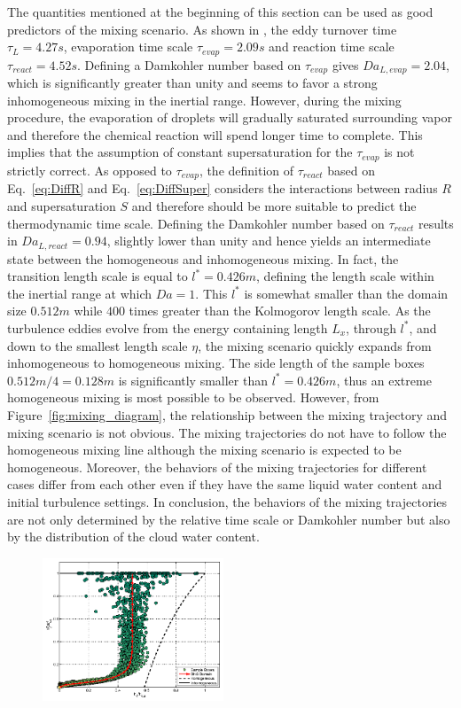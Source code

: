 \documentclass[draft,jgrga]{AGUTeX}
\newcommand{\Eq}[1]{Eq.~\eqref{#1}} \newcommand{\Fig}[1]{Figure~\ref{#1}}
\begin{document}
\begin{article}
The quantities mentioned at the beginning of this section can be used as good predictors of the mixing scenario. As shown in , the eddy turnover time $\tau_L = 4.27s$, evaporation time scale $\tau_{evap} = 2.09s$ and reaction time scale $\tau_{react} = 4.52s$. Defining a Damkohler number based on $\tau_{evap}$ gives $Da_{L,evap} = 2.04$, which is significantly greater than unity and seems to favor a strong inhomogeneous mixing in the inertial range. However, during the mixing procedure, the evaporation of droplets will gradually saturated surrounding vapor and therefore the chemical reaction will spend longer time to complete. This implies that the assumption of constant supersaturation for the $\tau_{evap}$ is not strictly correct. 
As opposed to $\tau_{evap}$, the definition of $\tau_{react}$ based on \Eq{eq:DiffR} and \Eq{eq:DiffSuper} considers the interactions between radius $R$ and supersaturation $S$ and therefore should be more suitable to predict the thermodynamic time scale. Defining the Damkohler number based on $\tau_{react}$ results in $Da_{L,react} = 0.94$, slightly lower than unity and hence yields an intermediate state between the homogeneous and inhomogeneous mixing. In fact, the transition length scale is equal to $l^{*} = 0.426m$, defining the length scale within the inertial range at which $Da = 1$. This $l^*$ is somewhat smaller than the domain size $0.512m$ while $400$ times greater than the Kolmogorov length scale. As the turbulence eddies evolve from the energy containing length $L_x$, through $l^*$, and down to the smallest length scale $\eta$, the mixing scenario quickly expands from inhomogeneous to homogeneous mixing. The side length of the sample boxes $0.512m/4 = 0.128 m$ is significantly smaller than $l^* = 0.426m$, thus an extreme homogeneous mixing is most possible to be observed. However, from \Fig{fig:mixing_diagram}, the relationship between the mixing trajectory and mixing scenario is not obvious. The mixing trajectories do not have to follow the homogeneous mixing line although the mixing scenario is expected to be homogeneous. Moreover, the behaviors of the mixing trajectories for different cases differ from each other even if they have the same liquid water content and initial turbulence settings. In conclusion, the behaviors of the mixing trajectories are not only determined by the relative time scale or Damkohler number but also by the distribution of the cloud water content. 
\begin{figure}\centering
\includegraphics[width=0.48\textwidth]{Figures/mixing_cased1}

\end{figure}
\end{article}
\end{document}
